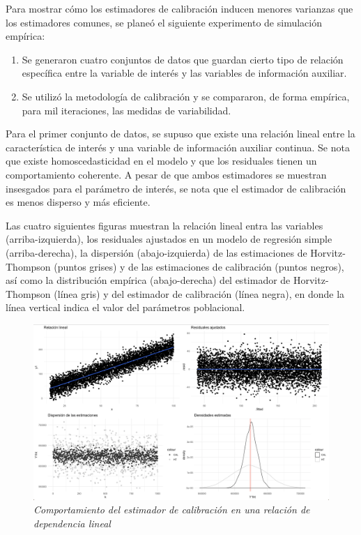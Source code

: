 \documentclass[
  12pt,
]{book}
\providecommand{\tightlist}{%
  \setlength{\itemsep}{0pt}\setlength{\parskip}{0pt}}
\begin{document}
Para mostrar cómo los estimadores de calibración inducen menores varianzas que los estimadores comunes, se planeó el siguiente experimento de simulación empírica:

\begin{enumerate}
\def\labelenumi{\arabic{enumi}.}
\tightlist
\item
  Se generaron cuatro conjuntos de datos que guardan cierto tipo de relación específica entre la variable de interés y las variables de información auxiliar.
\item
  Se utilizó la metodología de calibración y se compararon, de forma empírica, para mil iteraciones, las medidas de variabilidad.
\end{enumerate}

Para el primer conjunto de datos, se supuso que existe una relación lineal entre la característica de interés y una variable de información auxiliar continua. Se nota que existe homoscedasticidad en el modelo y que los residuales tienen un comportamiento coherente. A pesar de que ambos estimadores se muestran insesgados para el parámetro de interés, se nota que el estimador de calibración es menos disperso y más eficiente.

Las cuatro siguientes figuras muestran la relación lineal entra las variables (arriba-izquierda), los residuales ajustados en un modelo de regresión simple (arriba-derecha), la dispersión (abajo-izquierda) de las estimaciones de Horvitz-Thompson (puntos grises) y de las estimaciones de calibración (puntos negros), así como la distribución empírica (abajo-derecha) del estimador de Horvitz-Thompson (línea gris) y del estimador de calibración (línea negra), en donde la línea vertical indica el valor del parámetros poblacional.

\begin{figure}
\centering
\includegraphics{Pics/c5.png}
\caption{\emph{Comportamiento del estimador de calibración en una relación de dependencia lineal}}
\end{figure}
\end{document}
